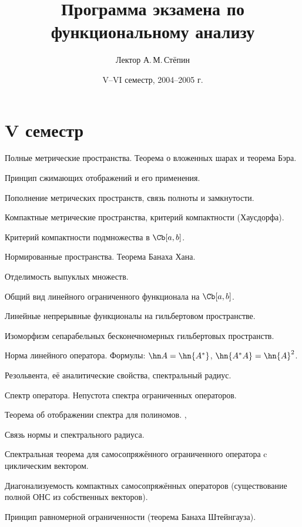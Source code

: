 \documentclass[a4paper]{article}
\title{Программа экзамена по функциональному анализу}
\author{Лектор А.\,М.\,Стёпин}
\date{V--VI семестр, 2004--2005 г.}
\begin{document}
\maketitle

\section*{V семестр}
\begin{nums}{-3}
\item Полные метрические пространства. Теорема о вложенных шарах и теорема Бэра. \cite[II, 3]{kf}
\item Принцип сжимающих отображений и его применения. \cite[II, 4]{kf}
\item Пополнение метрических пространств, связь полноты и замкнутости. \cite[II, 3]{kf}
\item Компактные метрические пространства, критерий компактности (Хаусдорфа). \cite[II, 7]{kf}
\item Критерий компактности подмножества в $\Cb[a,b]$. \cite[II, 7]{kf}
\item Нормированные пространства. Теорема Банаха Хана. \cite[IV, 1]{ls}
\item Отделимость выпуклых множеств. \cite[IV, \S~1, п.~3]{kf}
\item Общий вид линейного ограниченного функционала на $\Cb[a,b]$. \cite{ls}
\item Линейные непрерывные функционалы на гильбертовом пространстве.
\item Изоморфизм сепарабельных бесконечномерных гильбертовых пространств. \cite{kf}
\item Норма линейного оператора. Формулы: $\hn A = \hn{A^*}$, $\hn{A^*A} = \hn{A}^2$.
\item Резольвента, её аналитические свойства, спектральный радиус. \cite[IV, 6]{kf}
\item Спектр оператора. Непустота спектра ограниченных операторов. \cite[V, 1]{kg}
\item Теорема об отображении спектра для полиномов. \cite[V, 1]{kg}, \cite[I том]{rs}
\item Связь нормы и спектрального радиуса. \cite[V, 1]{kf}
\item Спектральная теорема для самосопряжённого ограниченного оператора c циклическим вектором. \cite{rs}
\item Диагонализуемость компактных самосопряжённых операторов (существование полной ОНС из собственных векторов).
\item Принцип равномерной ограниченности (теорема Банаха Штейнгауза). \cite[III, 4]{ls}

\end{nums}
\end{document}
